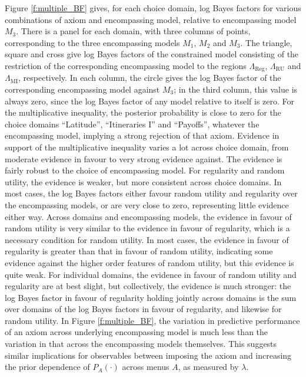 \documentclass[11pt,letter]{article}
\newcommand{\menus}{menus}
\begin{document}
Figure \ref{f:multiple_BF} gives, for each choice domain, log Bayes factors for various combinations of axiom and encompassing model, relative to encompassing model $M_3$.
There is a panel for each domain, with three columns of points, corresponding to the three encompassing models $M_1$, $M_2$ and $M_3$.
The triangle, square and cross give log Bayes factors of the constrained model consisting of the restriction of the corresponding encompassing model to the regions $\Lambda_{\mathrm{Reg}}$, $\Lambda_{\mathrm{RU}}$ and $\Lambda_{\mathrm{MI}}$, respectively.
In each column, the circle gives the log Bayes factor of the corresponding encompassing model against $M_3$; in the third column, this value is always zero, since the log Bayes factor of any model relative to itself is zero.
For the multiplicative inequality, the posterior probability is close to zero for the choice domains ``Latitude'', ``Itineraries I'' and ``Payoffs'', whatever the encompassing model, implying a strong rejection of that axiom.
Evidence in support of the multiplicative inequality varies a lot across choice domain, from moderate evidence in favour to very strong evidence against.
The evidence is fairly robust to the choice of encompassing model.
For regularity and random utility, the evidence is weaker, but more consistent across choice domains.
In most cases, the log Bayes factors either favour random utility and regularity over the encompassing models, or are very close to zero, representing little evidence either way.
Across domains and encompassing models, the evidence in favour of random utility is very similar to the evidence in favour of regularity, which is a necessary condition for random utility.
In most cases, the evidence in favour of regularity is greater than that in favour of random utility, indicating some evidence against the higher order features of random utility, but this evidence is quite weak.
For individual domains, the evidence in favour of random utility and regularity are at best slight, but collectively, the evidence is much stronger: the log Bayes factor in favour of regularity holding jointly across domains is the sum over domains of the log Bayes factors in favour of regularity, and likewise for random utility.
In Figure \ref{f:multiple_BF}, the variation in predictive performance of an axiom across underlying encompassing model is much less than the variation in that across the encompassing models themselves.
This suggests similar implications for observables between imposing the axiom and increasing the prior dependence of $P_A(\cdot)$ across \menus{} $A$, as measured by $\lambda$.
\end{document}
